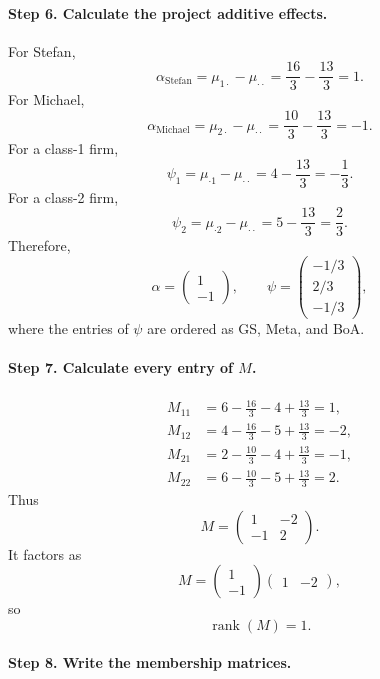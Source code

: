 \documentclass[11pt]{article}
\newcommand{\rank}{\operatorname{rank}}
\begin{document}
\paragraph{Step 6. Calculate the project additive effects.}

For Stefan,
\[
\alpha_{\text{Stefan}}
=
\mu_{1\cdot}-\mu_{\cdot\cdot}
=
\frac{16}{3}-\frac{13}{3}
=1.
\tag{65}
\]
For Michael,
\[
\alpha_{\text{Michael}}
=
\mu_{2\cdot}-\mu_{\cdot\cdot}
=
\frac{10}{3}-\frac{13}{3}
=-1.
\tag{66}
\]
For a class-1 firm,
\[
\psi_1
=
\mu_{\cdot1}-\mu_{\cdot\cdot}
=
4-\frac{13}{3}
=-\frac13.
\tag{67}
\]
For a class-2 firm,
\[
\psi_2
=
\mu_{\cdot2}-\mu_{\cdot\cdot}
=
5-\frac{13}{3}
=\frac23.
\tag{68}
\]
Therefore,
\[
\alpha
=
\begin{pmatrix}
1\\
-1
\end{pmatrix},
\qquad
\psi
=
\begin{pmatrix}
-1/3\\
2/3\\
-1/3
\end{pmatrix},
\tag{69}
\]
where the entries of \(\psi\) are ordered as GS, Meta, and BoA.

\paragraph{Step 7. Calculate every entry of \(M\).}

\begin{align*}
M_{11}
&=
6-\frac{16}{3}-4+\frac{13}{3}
=1,\\
M_{12}
&=
4-\frac{16}{3}-5+\frac{13}{3}
=-2,\\
M_{21}
&=
2-\frac{10}{3}-4+\frac{13}{3}
=-1,\\
M_{22}
&=
6-\frac{10}{3}-5+\frac{13}{3}
=2.
\end{align*}
Thus
\[
M
=
\begin{pmatrix}
1&-2\\
-1&2
\end{pmatrix}.
\tag{70}
\]
It factors as
\[
M
=
\begin{pmatrix}
1\\
-1
\end{pmatrix}
\begin{pmatrix}
1&-2
\end{pmatrix},
\tag{71}
\]
so
\[
\rank(M)=1.
\tag{72}
\]

\paragraph{Step 8. Write the membership matrices.}
\end{document}
